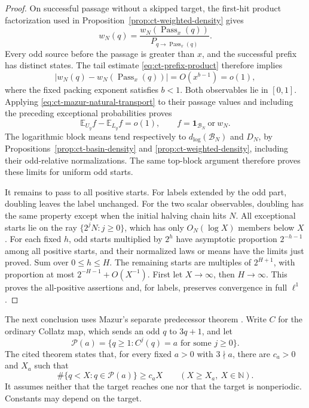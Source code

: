 \documentclass[11pt,a4paper]{article}
\begin{document}
\begin{proof}
On successful passage without a skipped target, the first-hit
product factorization used in
Proposition~\ref{prop:ct-weighted-density} gives
\[
 w_N(q)=\frac{w_N(\operatorname{Pass}_x(q))}{P_{
                 q\to\operatorname{Pass}_x(q)}}.
\]
Every odd source before the passage is greater than \(x\), and
the successful prefix has distinct states. The tail estimate
\eqref{eq:ct-prefix-product} therefore implies
\[
 |w_N(q)-w_N(\operatorname{Pass}_x(q))|
       =O(x^{b-1})=o(1),
\]
where the fixed packing exponent satisfies \(b<1\).
Both observables lie in \([0,1]\). Applying
\eqref{eq:ct-mazur-natural-transport} to their passage values and
including the preceding exceptional probabilities proves
\[
 \mathbb E_{U_y}f-\mathbb E_{L_y}f=o(1),
 \qquad f=\mathbf1_{\mathcal B_N}\ \text{or}\ w_N.
\]
The logarithmic block means tend respectively to
\(d_{\log}(\mathcal B_N)\) and \(D_N\), by
Propositions~\ref{prop:ct-basin-density} and
\ref{prop:ct-weighted-density}, including their odd-relative
normalizations. The same top-block argument therefore proves these
limits for uniform odd starts.

It remains to pass to all positive starts. For labels extended by
the odd part, doubling leaves the label unchanged. For the two
scalar observables, doubling has the same property except when the
initial halving chain hits \(N\). All exceptional starts lie on
the ray \(\{2^jN:j\ge0\}\), which has only \(O_N(\log X)\)
members below \(X\). For each fixed \(h\), odd starts multiplied
by \(2^h\) have asymptotic proportion \(2^{-h-1}\) among all
positive starts, and their normalized laws or means have the limits
just proved. Sum over \(0\le h\le H\). The remaining starts
are multiples of \(2^{H+1}\), with proportion at most
\(2^{-H-1}+O(X^{-1})\). First let \(X\to\infty\), then
\(H\to\infty\). This proves the all-positive assertions and,
for labels, preserves convergence in full \(\ell^1\).
\end{proof}

The next conclusion uses Mazur's separate predecessor theorem
\cite[Theorem~1.1]{MazurPredecessors2026}. Write \(C\) for the
ordinary Collatz map, which sends an odd \(q\) to \(3q+1\),
and let
\[
 \mathcal P(a)=\{q\ge1:C^j(q)=a\text{ for some }j\ge0\}.
\]
The cited theorem states that, for every fixed \(a>0\) with
\(3\nmid a\), there are \(c_a>0\) and \(X_a\) such that
\[
 \#\{q<X:q\in\mathcal P(a)\}\ge c_aX
 \qquad(X\ge X_a,\ X\in\mathbb N).
\]
It assumes neither that the target reaches one nor that the target
is nonperiodic. Constants may depend on the target.
\end{document}
